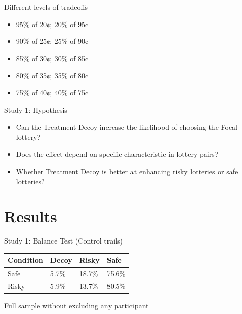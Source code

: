 \documentclass[
  ignorenonframetext,
  aspectratio=169]{beamer}
\begin{document}
\begin{frame}{Different levels of tradeoffs}
\label{different-levels-of-tradeoffs}
\begin{itemize}
  \item 95\% of 20¢; 20\% of 95¢
  \item 90\% of 25¢; 25\% of 90¢
  \item 85\% of 30¢; 30\% of 85¢
  \item 80\% of 35¢; 35\% of 80¢
  \item 75\% of 40¢; 40\% of 75¢
\end{itemize}
\end{frame}

\begin{frame}{Study 1: Hypothesis}
\label{study-1-hypothesis}
\begin{itemize}
  \item Can the Treatment Decoy increase the likelihood of choosing the Focal lottery?
  \pause
  \item Does the effect depend on specific characteristic in lottery pairs?
  \pause
  \item Whether Treatment Decoy is better at enhancing risky lotteries or safe lotteries?
\end{itemize}
\end{frame}

\section{Results}\label{results}

\begin{frame}{Study 1: Balance Test (Control trails)}
\label{study-1-balance-test-control-trails}
\begin{table}
\centering
\begin{tabular}{llll}
\toprule
Condition & Decoy & Risky & Safe\\
\midrule
Safe & 5.7\% & 18.7\% & 75.6\%\\
Risky & 5.9\% & 13.7\% & 80.5\%\\
\bottomrule
\end{tabular}
\end{table}

\vfill

\hfill \tiny *Full sample without excluding any participant
\end{frame}
\end{document}
